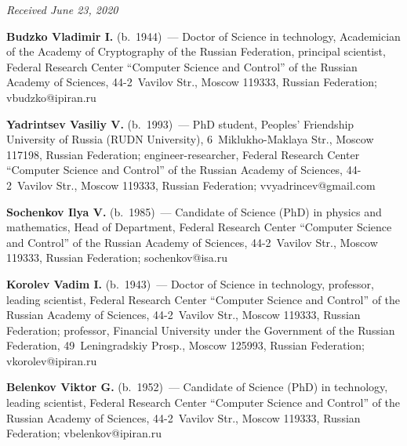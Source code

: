 \vspace*{-6pt}

\hfill{\small\textit{Received June 23, 2020}}


\vspace*{-16pt}


\Contr

\vspace*{-3pt}

\noindent
\textbf{Budzko Vladimir I.} (b.\ 1944)~--- Doctor of Science in technology, Academician of the 
Academy of Cryptography of the Russian Federation, principal scientist, Federal Research Center 
``Computer Science and Control'' of the Russian Academy of Sciences, 44-2~Vavilov Str., Moscow 
119333, Russian Federation; \mbox{vbudzko@ipiran.ru}
     
    \pagebreak
     
     \noindent
     \textbf{Yadrintsev Vasiliy V.} (b.\ 1993)~--- PhD student, Peoples' Friendship University of Russia 
(RUDN University), 6~Miklukho-Maklaya Str., Moscow 117198, Russian Federation; 
engineer-researcher, Federal Research Center ``Computer Science and Control'' of the Russian Academy of 
Sciences, 44-2~Vavilov Str., Moscow 119333, Russian Federation; \mbox{vvyadrincev@gmail.com}
     
     \vspace*{3pt}
     
     \noindent
\textbf{Sochenkov Ilya V.} (b.\ 1985)~--- Candidate of Science (PhD) in physics and mathematics, Head 
of Department, Federal Research Center ``Computer Science and Control'' of the Russian Academy of 
Sciences, 44-2~Vavilov Str., Moscow 119333, Russian Federation; \mbox{sochenkov@isa.ru}
     
     \vspace*{3pt}
     
     \noindent
     \textbf{Korolev Vadim I.} (b.\ 1943)~--- Doctor of Science in technology, professor, leading 
scientist, Federal Research Center ``Computer Science and Control'' of the Russian Academy of 
Sciences, 44-2~Vavilov Str., Moscow 119333, Russian Federation; professor, Financial University under 
the Government of the Russian Federation, 49~Leningradskiy Prosp., Moscow 125993, Russian 
Federation; \mbox{vkorolev@ipiran.ru}
     
     \vspace*{3pt}
     
     \noindent
     \textbf{Belenkov Viktor G.} (b.\ 1952)~--- Candidate of Science (PhD) in technology, leading 
scientist, Federal Research Center ``Computer Science and Control'' of the Russian Academy of 
Sciences, 44-2~Vavilov Str., Moscow 119333, Russian Federation; \mbox{vbelenkov@ipiran.ru}
\label{end\stat}

\renewcommand{\bibname}{\protect\rm Литература} 
  